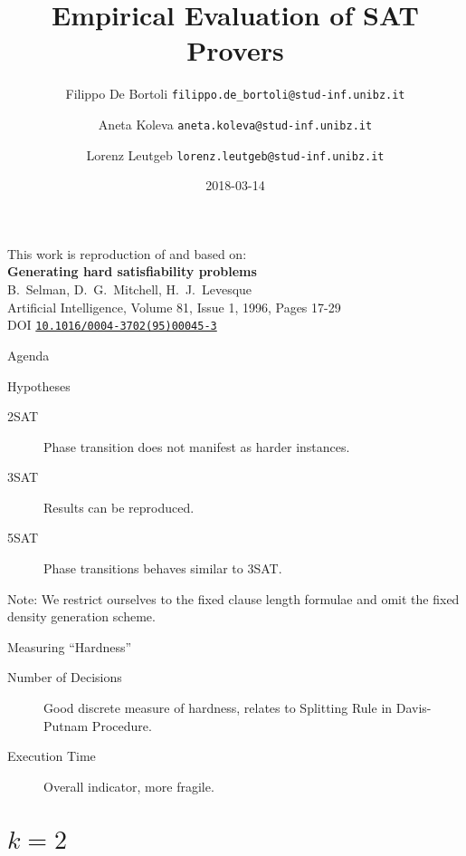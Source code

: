 \documentclass[xcolor={table,usenames,dvipsnames}]{beamer}
\title{Empirical Evaluation of SAT Provers}
\author{Filippo De Bortoli \texorpdfstring{\newline \texttt{\tiny filippo.de\_bortoli@stud-inf.unibz.it} \newline }{<lorenz.leutgeb@stud-inf.unibz.it>}%
\and Aneta Koleva \texorpdfstring{\newline \texttt{\tiny aneta.koleva@stud-inf.unibz.it} \newline}{<aneta.koleva@stud-inf.unibz.it>}%
\and Lorenz Leutgeb \texorpdfstring{\newline \texttt{\tiny lorenz.leutgeb@stud-inf.unibz.it} \newline}{<lorenz.leutgeb@stud-inf.unibz.it>}}
\institute{Free University of Bozen-Bolzano}
\date{2018-03-14}
\begin{document}
\begin{frame}[plain]
\maketitle
\end{frame}

\begin{frame}[plain]
This work is reproduction of and based on:\\[3mm]

{\large\bfseries Generating hard satisfiability problems}\\[1mm]
B.\ Selman, D.\ G.\ Mitchell, H.\ J.\ Levesque\\[2mm]
Artificial Intelligence, Volume 81, Issue 1, 1996, Pages 17-29\\[1mm]
DOI \href{http://dx.doi.org/10.1016/0004-3702(95)00045-3}{\texttt{10.1016/0004-3702(95)00045-3}}\\[3mm]
{\small \color{gray}{(detailed reference in the end)}}
\end{frame}

\begin{frame}{Agenda}
\tableofcontents
\end{frame}

\begin{frame}{Hypotheses}
\begin{description}
	\item[2SAT]{Phase transition does not manifest as harder instances.}
    \item[3SAT]{Results can be reproduced.}
    \item[5SAT]{Phase transitions behaves similar to 3SAT.}
\end{description}

\alert{Note:} We restrict ourselves to the fixed clause length formulae and omit the fixed density generation scheme.
\end{frame}

\begin{frame}{Measuring \enquote{Hardness}}
\begin{description}
    \item[Number of Decisions]{Good discrete measure of hardness, relates to \alert{Splitting Rule}  in Davis-Putnam Procedure.}
	\item[Execution Time]{Overall indicator, more fragile.}
\end{description}
\end{frame}

\section{$k = 2$}
\end{document}
